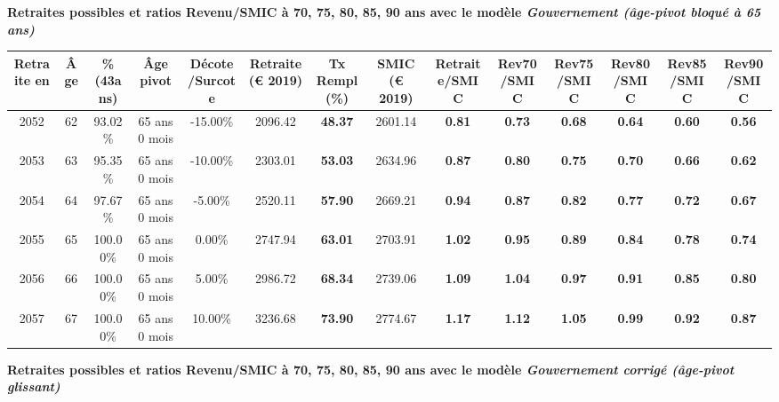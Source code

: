 {\bf \noindent Retraites possibles et ratios Revenu/SMIC à 70, 75, 80, 85, 90 ans avec le modèle \emph{Gouvernement (âge-pivot bloqué à 65 ans)}}  
 
\begin{adjustbox}{max width=\textwidth} 
\begin{tabular}[htb]{|c|c||c|c|c||c|c||c||c|c|c|c|c|c|} 
\hline 
 Retraite en &  Âge &  \%(43ans) &  Âge pivot &  Décote/Surcote &  Retraite (\euro{} 2019) &  Tx Rempl(\%) &  SMIC (\euro{} 2019) &  Retraite/SMIC &  Rev70/SMIC &  Rev75/SMIC &  Rev80/SMIC &  Rev85/SMIC &  Rev90/SMIC \\ 
\hline \hline 
 2052 &  62 &  93.02\% &  65 ans 0 mois &  -15.00\% &  2096.42 &  {\bf 48.37} &  2601.14 &  {\bf {\color{red} 0.81}} &  {\bf {\color{red} 0.73}} &  {\bf {\color{red} 0.68}} &  {\bf {\color{red} 0.64}} &  {\bf {\color{red} 0.60}} &  {\bf {\color{red} 0.56}} \\ 
\hline 
 2053 &  63 &  95.35\% &  65 ans 0 mois &  -10.00\% &  2303.01 &  {\bf 53.03} &  2634.96 &  {\bf {\color{red} 0.87}} &  {\bf {\color{red} 0.80}} &  {\bf {\color{red} 0.75}} &  {\bf {\color{red} 0.70}} &  {\bf {\color{red} 0.66}} &  {\bf {\color{red} 0.62}} \\ 
\hline 
 2054 &  64 &  97.67\% &  65 ans 0 mois &  -5.00\% &  2520.11 &  {\bf 57.90} &  2669.21 &  {\bf {\color{red} 0.94}} &  {\bf {\color{red} 0.87}} &  {\bf {\color{red} 0.82}} &  {\bf {\color{red} 0.77}} &  {\bf {\color{red} 0.72}} &  {\bf {\color{red} 0.67}} \\ 
\hline 
 2055 &  65 &  100.00\% &  65 ans 0 mois &  0.00\% &  2747.94 &  {\bf 63.01} &  2703.91 &  {\bf 1.02} &  {\bf {\color{red} 0.95}} &  {\bf {\color{red} 0.89}} &  {\bf {\color{red} 0.84}} &  {\bf {\color{red} 0.78}} &  {\bf {\color{red} 0.74}} \\ 
\hline 
 2056 &  66 &  100.00\% &  65 ans 0 mois &  5.00\% &  2986.72 &  {\bf 68.34} &  2739.06 &  {\bf 1.09} &  {\bf 1.04} &  {\bf {\color{red} 0.97}} &  {\bf {\color{red} 0.91}} &  {\bf {\color{red} 0.85}} &  {\bf {\color{red} 0.80}} \\ 
\hline 
 2057 &  67 &  100.00\% &  65 ans 0 mois &  10.00\% &  3236.68 &  {\bf 73.90} &  2774.67 &  {\bf 1.17} &  {\bf 1.12} &  {\bf 1.05} &  {\bf {\color{red} 0.99}} &  {\bf {\color{red} 0.92}} &  {\bf {\color{red} 0.87}} \\ 
\hline 
\hline 
\end{tabular} 
\end{adjustbox} 
 
 \vspace{0.1cm} 
{\bf \noindent Retraites possibles et ratios Revenu/SMIC à 70, 75, 80, 85, 90 ans avec le modèle \emph{Gouvernement corrigé (âge-pivot glissant)}}  
 
